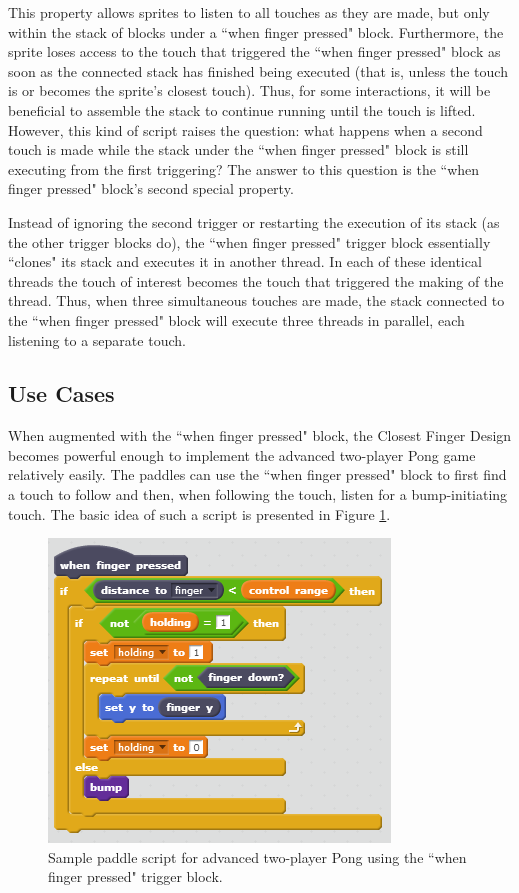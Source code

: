 This property allows sprites to listen to all touches as they are made, but only within the stack of blocks under a ``when finger pressed" block. Furthermore, the sprite loses access to the touch that triggered the ``when finger pressed" block as soon as the connected stack has finished being executed (that is, unless the touch is or becomes the sprite's closest touch). Thus, for some interactions, it will be beneficial to assemble the stack to continue running until the touch is lifted. However, this kind of script raises the question: what happens when a second touch is made while the stack under the ``when finger pressed" block is still executing from the first triggering? The answer to this question is the ``when finger pressed" block's second special property.

Instead of ignoring the second trigger or restarting the execution of its stack (as the other trigger blocks do), the ``when finger pressed" trigger block essentially ``clones" its stack and executes it in another thread. In each of these identical threads the touch of interest becomes the touch that triggered the making of the thread. Thus, when three simultaneous touches are made, the stack connected to the ``when finger pressed" block will execute three threads in parallel, each listening to a separate touch.
 
\subsection{Use Cases}

When augmented with the ``when finger pressed" block, the Closest Finger Design becomes powerful enough to implement the advanced two-player Pong game relatively easily. The paddles can use the ``when finger pressed" block to first find a touch to follow and then, when following the touch, listen for a bump-initiating touch. The basic idea of such a script is presented in Figure \ref{AdvancedTwoPlayerPongCFD}.

\begin{figure}
\centering
\includegraphics{images/AdvancedTwoPlayerPongCFD.PNG}
\caption[Sample Script for Advanced Two-Player Pong Using the Closest Finger Design Extension]{Sample paddle script for advanced two-player Pong using the ``when finger pressed" trigger block.}
\label{AdvancedTwoPlayerPongCFD}
\end{figure}


